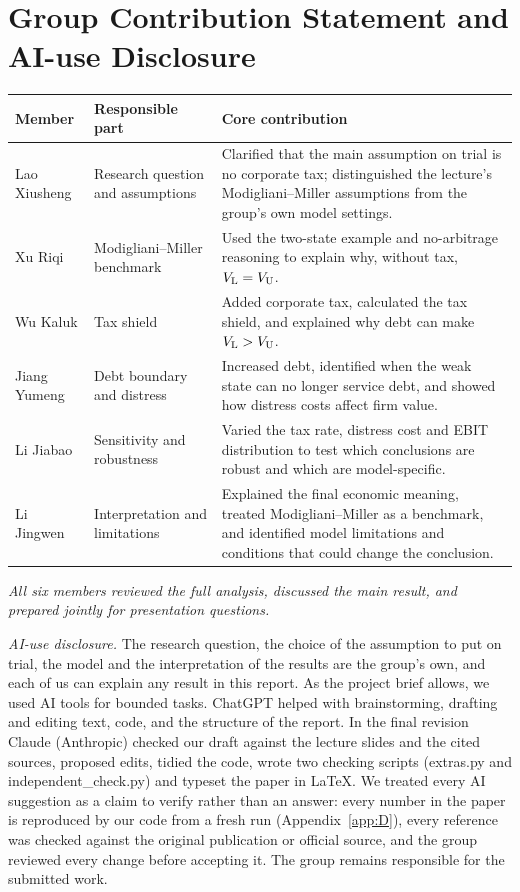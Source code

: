 \section*{Group Contribution Statement and AI-use Disclosure}

{\footnotesize\noindent\begin{tabularx}{\linewidth}{@{}l l L@{}}
\toprule
\textbf{Member} & \textbf{Responsible part} & \textbf{Core contribution} \\
\midrule
Lao Xiusheng & Research question and assumptions & Clarified that the main assumption on trial is no corporate tax; distinguished the lecture's Modigliani--Miller assumptions from the group's own model settings. \\
\addlinespace
Xu Riqi & Modigliani--Miller benchmark & Used the two-state example and no-arbitrage reasoning to explain why, without tax, $V_{\mathrm{L}} = V_{\mathrm{U}}$. \\
\addlinespace
Wu Kaluk & Tax shield & Added corporate tax, calculated the tax shield, and explained why debt can make $V_{\mathrm{L}} > V_{\mathrm{U}}$. \\
\addlinespace
Jiang Yumeng & Debt boundary and distress & Increased debt, identified when the weak state can no longer service debt, and showed how distress costs affect firm value. \\
\addlinespace
Li Jiabao & Sensitivity and robustness & Varied the tax rate, distress cost and EBIT distribution to test which conclusions are robust and which are model-specific. \\
\addlinespace
Li Jingwen & Interpretation and limitations & Explained the final economic meaning, treated Modigliani--Miller as a benchmark, and identified model limitations and conditions that could change the conclusion. \\
\bottomrule
\end{tabularx}\par}

\medskip
{\small
\noindent\textit{All six members reviewed the full analysis, discussed the main result, and prepared jointly for presentation questions.}

\smallskip
\noindent\textit{AI-use disclosure.} The research question, the choice of the assumption to put on trial, the model and the interpretation of the results are the group's own, and each of us can explain any result in this report. As the project brief allows, we used AI tools for bounded tasks. ChatGPT helped with brainstorming, drafting and editing text, code, and the structure of the report. In the final revision Claude (Anthropic) checked our draft against the lecture slides and the cited sources, proposed edits, tidied the code, wrote two checking scripts (extras.py and independent\_check.py) and typeset the paper in \LaTeX{}. We treated every AI suggestion as a claim to verify rather than an answer: every number in the paper is reproduced by our code from a fresh run (Appendix~\ref{app:D}), every reference was checked against the original publication or official source, and the group reviewed every change before accepting it. The group remains responsible for the submitted work.\par}
